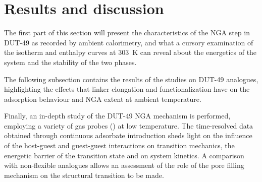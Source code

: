 
\section{Results and discussion}

The first part of this section will present the characteristics of the
\gls{NGA} step in DUT-49 as recorded by ambient calorimetry, 
and what a cursory examination of the isotherm and enthalpy
curves at \SI{303}{\kelvin} can reveal about the energetics of the 
system and the stability of the two phases.

The following subsection contains the results of the studies on 
DUT-49 analogues, highlighting the effects that linker elongation
and functionalization have on the adsorption behaviour and \gls{NGA}
extent at ambient temperature.

Finally, an in-depth study of the DUT-49 \gls{NGA} mechanism is performed,
employing a variety of gas probes () at low temperature.
The time-resolved data obtained through continuous adsorbate introduction
sheds light on the influence of the host-guest and guest-guest interactions
on transition mechanics, the energetic barrier of the transition state
and on system kinetics. A comparison with non-flexible analogues allows
an assessment of the role of the pore filling mechanism on the structural
transition to be made.



